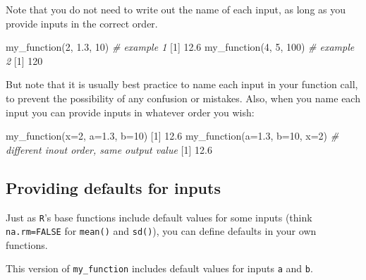 \documentclass[
]{book}
\newenvironment{Shaded}{\begin{snugshade}}{\end{snugshade}}
\newcommand{\AttributeTok}[1]{\textcolor[rgb]{0.77,0.63,0.00}{#1}}
\newcommand{\CommentTok}[1]{\textcolor[rgb]{0.56,0.35,0.01}{\textit{#1}}}
\newcommand{\DecValTok}[1]{\textcolor[rgb]{0.00,0.00,0.81}{#1}}
\newcommand{\FloatTok}[1]{\textcolor[rgb]{0.00,0.00,0.81}{#1}}
\newcommand{\FunctionTok}[1]{\textcolor[rgb]{0.00,0.00,0.00}{#1}}
\newcommand{\NormalTok}[1]{#1}
\begin{document}
Note that you do not need to write out the name of each input, as long as you provide inputs in the correct order.

\begin{Shaded}
\begin{Highlighting}[]
\FunctionTok{my\_function}\NormalTok{(}\DecValTok{2}\NormalTok{, }\FloatTok{1.3}\NormalTok{, }\DecValTok{10}\NormalTok{) }\CommentTok{\# example 1}
\NormalTok{[}\DecValTok{1}\NormalTok{] }\FloatTok{12.6}
\FunctionTok{my\_function}\NormalTok{(}\DecValTok{4}\NormalTok{, }\DecValTok{5}\NormalTok{, }\DecValTok{100}\NormalTok{) }\CommentTok{\# example 2}
\NormalTok{[}\DecValTok{1}\NormalTok{] }\DecValTok{120}
\end{Highlighting}
\end{Shaded}

But note that it is usually best practice to name each input in your function call, to prevent the possibility of any confusion or mistakes. Also, when you name each input you can provide inputs in whatever order you wish:

\begin{Shaded}
\begin{Highlighting}[]
\FunctionTok{my\_function}\NormalTok{(}\AttributeTok{x=}\DecValTok{2}\NormalTok{, }\AttributeTok{a=}\FloatTok{1.3}\NormalTok{, }\AttributeTok{b=}\DecValTok{10}\NormalTok{)}
\NormalTok{[}\DecValTok{1}\NormalTok{] }\FloatTok{12.6}
\FunctionTok{my\_function}\NormalTok{(}\AttributeTok{a=}\FloatTok{1.3}\NormalTok{, }\AttributeTok{b=}\DecValTok{10}\NormalTok{, }\AttributeTok{x=}\DecValTok{2}\NormalTok{) }\CommentTok{\# different inout order, same output value}
\NormalTok{[}\DecValTok{1}\NormalTok{] }\FloatTok{12.6}
\end{Highlighting}
\end{Shaded}

\hypertarget{providing-defaults-for-inputs}{%
\subsection*{Providing defaults for inputs}\label{providing-defaults-for-inputs}}

Just as \texttt{R}'s base functions include default values for some inputs (think \texttt{na.rm=FALSE} for \texttt{mean()} and \texttt{sd()}), you can define defaults in your own functions.

This version of \texttt{my\_function} includes default values for inputs \texttt{a} and \texttt{b}.
\end{document}
